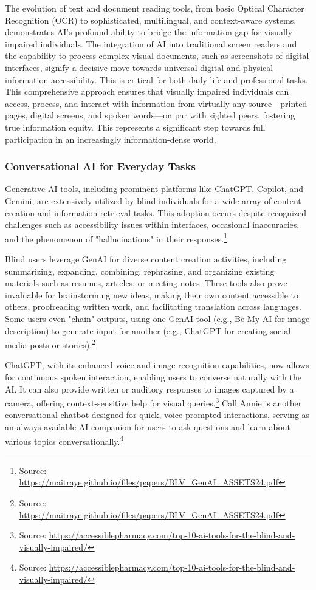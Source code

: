 The evolution of text and document reading tools, from basic Optical Character Recognition (OCR) to sophisticated, multilingual, and context-aware systems, demonstrates AI's profound ability to bridge the information gap for visually impaired individuals. The integration of AI into traditional screen readers and the capability to process complex visual documents, such as screenshots of digital interfaces, signify a decisive move towards universal digital and physical information accessibility. This is critical for both daily life and professional tasks. This comprehensive approach ensures that visually impaired individuals can access, process, and interact with information from virtually any source—printed pages, digital screens, and spoken words—on par with sighted peers, fostering true information equity. This represents a significant step towards full participation in an increasingly information-dense world.

\subsubsection{Conversational AI for Everyday Tasks}

Generative AI tools, including prominent platforms like ChatGPT, Copilot, and Gemini, are extensively utilized by blind individuals for a wide array of content creation and information retrieval tasks. This adoption occurs despite recognized challenges such as accessibility issues within interfaces, occasional inaccuracies, and the phenomenon of "hallucinations" in their responses.\footnote{Source: \url{https://maitraye.github.io/files/papers/BLV_GenAI_ASSETS24.pdf}}

Blind users leverage GenAI for diverse content creation activities, including summarizing, expanding, combining, rephrasing, and organizing existing materials such as resumes, articles, or meeting notes. These tools also prove invaluable for brainstorming new ideas, making their own content accessible to others, proofreading written work, and facilitating translation across languages. Some users even "chain" outputs, using one GenAI tool (e.g., Be My AI for image description) to generate input for another (e.g., ChatGPT for creating social media posts or stories).\footnote{Source: \url{https://maitraye.github.io/files/papers/BLV_GenAI_ASSETS24.pdf}}

ChatGPT, with its enhanced voice and image recognition capabilities, now allows for continuous spoken interaction, enabling users to converse naturally with the AI. It can also provide written or auditory responses to images captured by a camera, offering context-sensitive help for visual queries.\footnote{Source: \url{https://accessiblepharmacy.com/top-10-ai-tools-for-the-blind-and-visually-impaired/}} Call Annie is another conversational chatbot designed for quick, voice-prompted interactions, serving as an always-available AI companion for users to ask questions and learn about various topics conversationally.\footnote{Source: \url{https://accessiblepharmacy.com/top-10-ai-tools-for-the-blind-and-visually-impaired/}}

